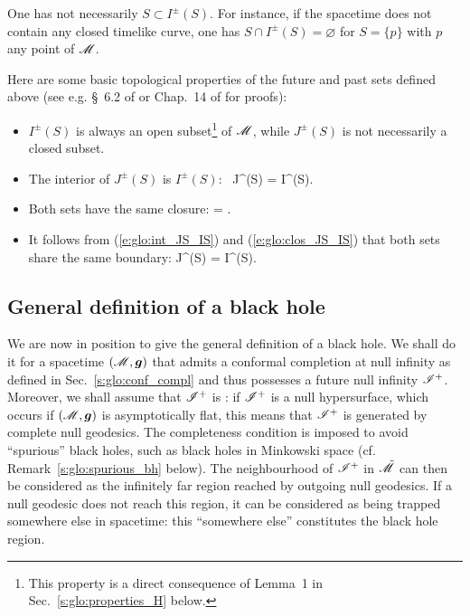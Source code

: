\begin{remark}
One has not necessarily $S \subset I^\pm(S)$. For instance,
if the spacetime does not contain
any closed timelike curve, one has  $S \cap I^\pm(S) = \varnothing$ for
$S = \{p\}$ with $p$ any point of $\mathscr{M}$.
\end{remark}

Here are some basic topological properties of the future and past sets
defined above (see e.g. \S~6.2 of \cite{HawkiE73} or Chap.~14 of
\cite{ONeil83} for proofs):
\begin{itemize}
\item
$I^\pm(S)$ is always an open subset\footnote{This property is a direct
consequence of Lemma~1 in Sec.~\ref{s:glo:properties_H} below.} of $\mathscr{M}$, while
$J^\pm(S)$ is not necessarily a closed subset.
\item The interior of $J^\pm(S)$ is $I^\pm(S)$:
\be \label{e:glo:int_JS_IS}
    \, J^\pm(S) = I^\pm(S).
\ee
\item Both sets have the same closure:
\be \label{e:glo:clos_JS_IS}
     =  .
\ee
\item
It follows from (\ref{e:glo:int_JS_IS}) and (\ref{e:glo:clos_JS_IS})
that both sets share the same boundary:
\be \label{e:glo:boundary_JS_IS}
    \partial J^\pm(S) = \partial I^\pm(S).
\ee
\end{itemize}

\subsection{General definition of a black hole} \label{s:glo:def_BH}

We are now in position to give the general definition of a black hole.
We shall do it for a spacetime $(\mathscr{M},\bm{g})$ that admits a conformal completion
at null infinity as defined in Sec.~\ref{s:glo:conf_compl} and thus
possesses a future null infinity $\mathscr{I}^+$.
Moreover, we shall assume that $\mathscr{I}^+$ is : if $\mathscr{I}^+$
is a null hypersurface, which occurs if $(\mathscr{M},\bm{g})$ is asymptotically flat,
this means that $\mathscr{I}^+$ is generated by complete null geodesics.
The completeness condition is imposed to avoid ``spurious'' black holes,
such as black holes in Minkowski space (cf. Remark~\ref{s:glo:spurious_bh} below).
The neighbourhood of $\mathscr{I}^+$
in $\tilde{\mathscr{M}}$ can then be considered as the infinitely far region
reached by outgoing null geodesics. If a null geodesic does not reach this
region, it can be considered as being trapped somewhere else in spacetime: this
``somewhere else'' constitutes the black hole region.

